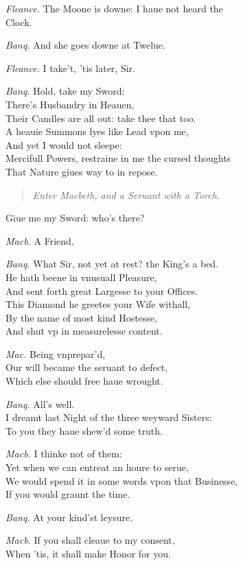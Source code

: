 \documentclass[12pt]{sides}
\newcommand{\StageDir}[1]{\begin{quote}\centering\em #1\end{quote}}
\newcommand{\dia}[1]{\hskip 15pt\textit{#1}\hskip 6pt}
\begin{document}
\begin{multicols}{2}
            \dia{Fleance.} The Moone is downe: I haue not heard the \\ Clock.
            
            \dia{Banq.} And she goes downe at Twelue.
            
            \dia{Fleance.} I take't, 'tis later, Sir.
            
            \dia{Banq.} Hold, take my Sword: \\ There's Husbandry in Heauen, \\ Their Candles are all out: take thee that too. \\ A heauie Summons lyes like Lead vpon me, \\ And yet I would not sleepe: \\ Mercifull Powers, restraine in me the cursed thoughts \\ That Nature giues way to in repose.
            \StageDir{Enter Macbeth, and a Seruant with a Torch.}
            Giue me my Sword: who's there?

            \dia{Macb.} A Friend.

            \dia{Banq.} What Sir, not yet at rest? the King's a bed. \\ He hath beene in vnusuall Pleasure, \\ And sent forth great Largesse to your Offices. \\ This Diamond he greetes your Wife withall, \\ By the name of most kind Hostesse, \\ And shut vp in measurelesse content.

            \dia{Mac.} Being vnprepar'd, \\ Our will became the seruant to defect, \\ Which else should free haue wrought.

            \dia{Banq.} All's well. \\ I dreamt last Night of the three weyward Sisters: \\ To you they haue shew'd some truth.

            \dia{Macb.} I thinke not of them: \\ Yet when we can entreat an houre to serue, \\ We would spend it in some words vpon that Businesse, \\ If you would graunt the time.

            \dia{Banq.} At your kind'st leysure.

            \dia{Macb.} If you shall cleaue to my consent, \\ When 'tis, it shall make Honor for you.


\end{multicols}
\end{document}
